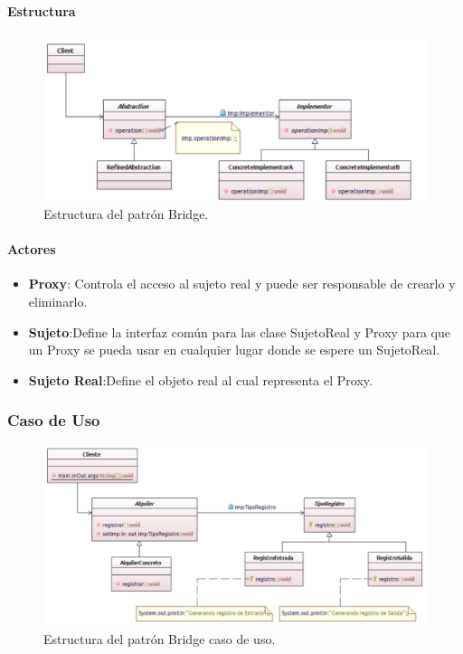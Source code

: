 \paragraph{Estructura}

\begin{figure}[th!]
	\centering
	\includegraphics[width=.7\linewidth]{imagenes/Patrones/Bridge.pdf}
	\caption{Estructura del patrón Bridge.\cite{gof}}	
\end{figure}

\paragraph{Actores}

\begin{itemize}
	\item \textbf{Proxy}: Controla el acceso al sujeto real y puede ser responsable de crearlo y eliminarlo.
	\item \textbf{Sujeto}:Define la interfaz común para las clase SujetoReal y Proxy para que un Proxy se pueda usar en cualquier lugar donde se espere un SujetoReal.
	\item \textbf{Sujeto Real}:Define el objeto real al cual representa el Proxy.
\end{itemize}


\subsubsection{Caso de Uso}
\begin{figure}[th!]
	\centering
	\includegraphics[width=.7\linewidth]{imagenes/Patrones/Bridge_caso.pdf}
	\caption{Estructura del patrón Bridge caso de uso.\cite{gof}}	
\end{figure}
